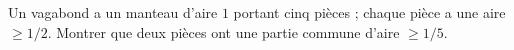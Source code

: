 Un vagabond a un manteau d'aire $1$ portant cinq pièces ; chaque pièce a une aire $\geq 1/2$. Montrer que deux pièces ont une partie commune d'aire $\geq 1/5$.
